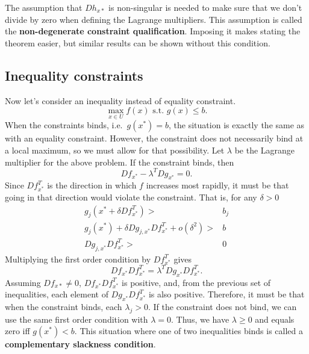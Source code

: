 \documentclass[12pt,reqno]{amsart}
\theoremstyle{definition}
\begin{document}
The assumption that $Dh_{x*}$ is non-singular is needed to make sure
that we don't divide by zero when defining the Lagrange
multipliers. This assumption is called the \textbf{non-degenerate
  constraint qualification}. Imposing it makes stating the theorem
easier, but similar results can be shown without this condition. 

\subsection{Inequality constraints}

Now let's consider an inequality instead of equality constraint. 
\[ \max_{x \in U} f(x) \text{ s.t. } g(x) \leq b. \] 
When the constraints binds, i.e.\ $g(x^*) = b$, the situation is exactly the
same as with an equality constraint. However, the constraint does not
necessarily bind at a local maximum, so we must allow for that
possibility.  Let $\lambda$ be the Lagrange multiplier for the above
problem. If the constraint binds, then
\[ Df_{x^*} - \lambda^T D g_{x^*} = 0. \] 
Since $Df_{x^*}^T$ is the
direction in which $f$ increases most rapidly, it must be that going
in that direction would violate the constraint. That is, for any
$\delta > 0$
\begin{align*} 
  g_j(x^* + \delta Df_{x^*}^T) > & b_j \\
  g_j(x^*) + \delta Dg_{j,x^*} Df_{x^*}^T + o(\delta^2) > & b \\
  Dg_{j,x^*} Df_{x^*}^T > & 0
\end{align*}
Multiplying the first order condition by $Df_{x^*}^T$ gives
\[ Df_{x^*} Df_{x^*}^T = \lambda^T D g_{x^*} D f_{x^*}^T. \] 
Assuming $Df_{x*} \neq 0$, $Df_{x^*} Df_{x^*}^T$ is positive, and, from the previous set of
inequalities, each element of $D g_{x^*} D f_{x^*}^T$ is also
positive. Therefore, it must be that when the constraint binds, each
$\lambda_j > 0$. If the constraint does not bind, we can use the same
first order condition with $\lambda=0$. Thus, we have $\lambda \geq 0$
and equals zero iff $g(x^*) < b$. This situation where one of two
inequalities binds is called a \textbf{complementary slackness
  condition}.
\end{document}
